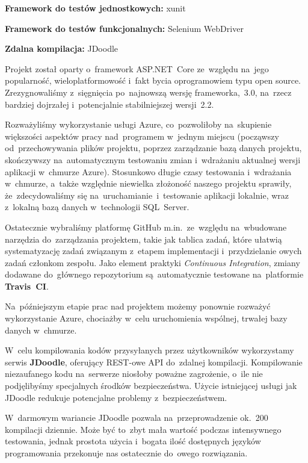 \documentclass{article}
\begin{document}
\textbf{Framework do testów jednostkowych:} xunit

\textbf{Framework do testów funkcjonalnych:} Selenium WebDriver

\textbf{Zdalna kompilacja:} JDoodle

Projekt został oparty o~framework ASP.NET~Core ze~względu na~jego popularność, wieloplatformowość i~fakt bycia oprogramowiem typu open source. Zrezygnowaliśmy z~sięgnięcia po~najnowszą wersję frameworka,~3.0, na~rzecz bardziej dojrzałej i~potencjalnie stabilniejszej wersji~2.2.

Rozważyliśmy wykorzystanie usługi Azure, co~pozwoliłoby na~skupienie większości aspektów pracy nad~programem w~jednym miejscu (począwszy od~przechowywania plików projektu, poprzez zarządzanie bazą danych projektu, skończywszy na~automatycznym testowaniu zmian i~wdrażaniu aktualnej wersji aplikacji w~chmurze Azure). Stosunkowo długie czasy testowania i~wdrażania w~chmurze, a~także względnie niewielka złożoność naszego projektu sprawiły, że~zdecydowaliśmy się na~uruchamianie~i~testowanie aplikacji lokalnie, wraz z~lokalną bazą danych w~technologii SQL~Server.

Ostatecznie wybraliśmy platformę GitHub m.in.~ze~względu na~wbudowane narzędzia do~zarządzania projektem, takie jak tablica zadań, które ułatwią systematyzację zadań związanym z~etapem implementacji i~przydzielanie owych zadań członkom zespołu. Jako element praktyki \emph{Continuous Integration}, zmiany dodawane do~głównego repozytorium są~automatycznie testowane na~platformie \textbf{Travis~CI}.

Na~późniejszym etapie prac nad projektem możemy ponownie rozważyć wykorzystanie Azure, chociażby w~celu uruchomienia wspólnej, trwałej bazy danych w~chmurze.

W~celu kompilowania kodów przysyłanych przez użytkowników wykorzystamy serwis \textbf{JDoodle}, oferujący REST-owe API do~zdalnej kompilacji. Kompilowanie niezaufanego kodu na~serwerze niosłoby poważne zagrożenie, o~ile nie podjęlibyśmy specjalnych środków bezpieczeństwa. Użycie istniejącej usługi jak JDoodle redukuje potencjalne problemy z~bezpieczeństwem.

W~darmowym wariancie JDoodle pozwala na~przeprowadzenie ok.~200 kompilacji dziennie. Może być to~zbyt mała wartość podczas intensywnego testowania, jednak prostota użycia i~bogata ilość dostępnych języków programowania przekonuje nas ostatecznie do~owego rozwiązania.

\end{document}
